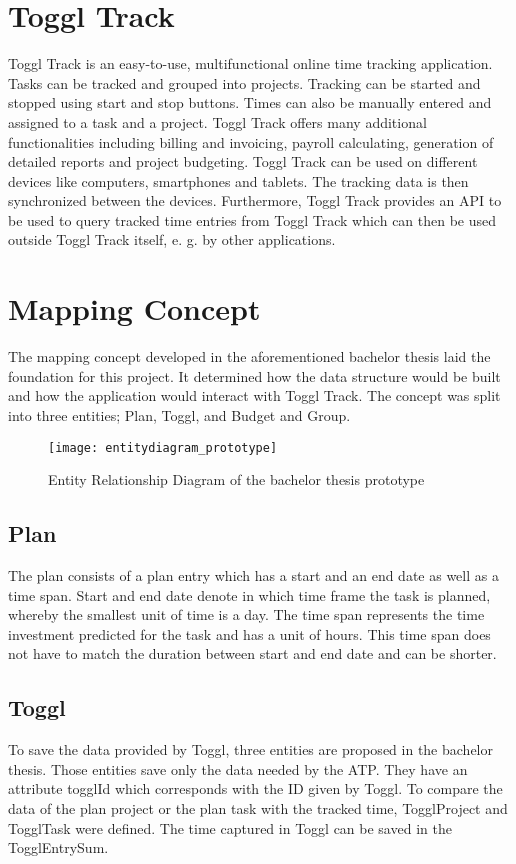 \section{Toggl Track}
Toggl Track is an easy-to-use, multifunctional online time tracking application. Tasks can be tracked and grouped into projects. Tracking can be started and stopped using start and stop buttons. Times can also be manually entered and assigned to a task and a project. Toggl Track offers many additional functionalities including billing and invoicing, payroll calculating, generation of detailed reports and project budgeting. Toggl Track can be used on different devices like computers, smartphones and tablets. The tracking data is then synchronized between the devices. Furthermore, Toggl Track provides an API to be used to query tracked time entries from Toggl Track which can then be used outside Toggl Track itself, e. g. by other applications. \cite{bachelorarbeit_Egger_Verstappen_page8} \cite{toggl_track_url}

\section{Mapping Concept}
The mapping concept developed in the aforementioned bachelor thesis \cite{bachelorarbeit_Egger_Verstappen_page20-22} laid the foundation for this project. It determined how the data structure would be built and how the application would interact with Toggl Track. The concept was split into three entities; Plan, Toggl, and Budget and Group. 

\begin{figure}[H]
	\centering
	\texttt{[image: entitydiagram\_prototype]}
	\caption{Entity Relationship Diagram of the bachelor thesis prototype}
	\label{figure2}
\end{figure}

\subsection{Plan}
The plan consists of a plan entry which has a start and an end date as well as a time span. Start and end date denote in which time frame the task is planned, whereby the smallest unit of time is a day. The time span represents the time investment predicted for the task and has a unit of hours. This time span does not have to match the duration between start and end date and can be shorter.
\subsection{Toggl}
To save the data provided by Toggl, three entities are proposed in the bachelor thesis. Those entities save only the data needed by the ATP. They have an attribute togglId which corresponds with the ID given by Toggl. To compare the data of the plan project or the plan task with the tracked time, TogglProject and TogglTask were defined. The time captured in Toggl can be saved in the TogglEntrySum.

